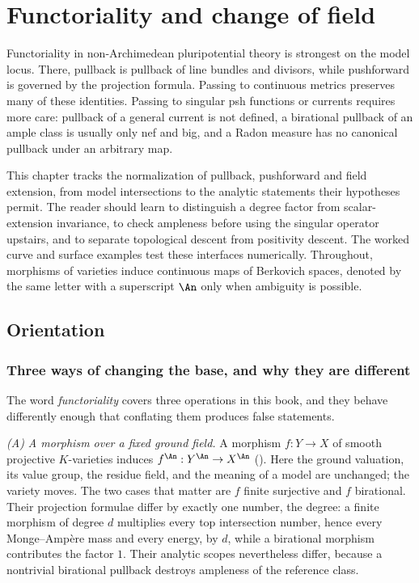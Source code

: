 \chapter{Functoriality and change of field}
\label{chap:bfj-functoriality}

Functoriality in non-Archimedean pluripotential theory is strongest on the
model locus.  There, pullback is pullback of line bundles and divisors,
while pushforward is governed by the projection formula.  Passing to
continuous metrics preserves many of these identities.  Passing to
singular psh functions or currents requires more care: pullback of a general
current is not defined, a birational pullback of an ample class is usually
only nef and big, and a Radon measure has no canonical pullback under an
arbitrary map.

This chapter tracks the normalization of pullback, pushforward and field
extension, from model intersections to the analytic statements their
hypotheses permit.  The reader should learn to distinguish a degree factor
from scalar-extension invariance, to check ampleness before using the
singular operator upstairs, and to separate topological descent from
positivity descent.  The worked curve and surface examples test these
interfaces numerically.
Throughout, morphisms of varieties induce continuous maps of Berkovich
spaces, denoted by the same letter with a superscript $\An$ only when
ambiguity is possible.

\section{Orientation}
\label{sec:ch30-orientation}

\subsection{Three ways of changing the base, and why they are different}
\label{sec:ch30-three-kinds}

The word \emph{functoriality} covers three operations in this book, and they
behave differently enough that conflating them produces false statements.

\emph{(A) A morphism over a fixed ground field.}  A morphism $f:Y\to X$ of
smooth projective $K$-varieties induces $f^{\An}:Y^{\An}\to X^{\An}$
().  Here the ground valuation, its value group,
the residue field, and the meaning of a model are unchanged; the
variety moves.  The two cases that matter are $f$ finite surjective and
$f$ birational.  Their projection formulae differ by exactly one number,
the degree: a finite morphism of degree $d$ multiplies every top
intersection number, hence every Monge--Amp\`ere mass and every energy, by
$d$, while a birational morphism contributes the factor $1$.  Their
analytic scopes nevertheless differ, because a nontrivial birational
pullback destroys ampleness of the reference class.

